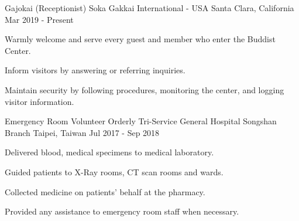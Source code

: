 

\begin{cventries}

  \cventry
    {Gajokai (Receptionist)} %
    {Soka Gakkai International - USA} %
    {Santa Clara, California} %
    {Mar 2019 - Present} %
    {
	\begin{cvitems} %
      	\item Warmly welcome and serve every guest and member who enter the Buddist Center.
      	\item Inform visitors by answering or referring inquiries.
      	\item Maintain security by following procedures, monitoring the center, and logging visitor information.
	\end{cvitems}
    }
    
  \cventry
    {Emergency Room Volunteer Orderly} %
    {Tri-Service General Hospital Songshan Branch} %
    {Taipei, Taiwan} %
    {Jul 2017 - Sep 2018} %
    {
	\begin{cvitems} %
      	\item Delivered blood, medical specimens to medical laboratory.
		\item Guided patients to X-Ray rooms, CT scan rooms and wards.       
      	\item Collected medicine on patients' behalf at the pharmacy.
      	\item Provided any assistance to emergency room staff when necessary.
	\end{cvitems}
    }


\end{cventries}
